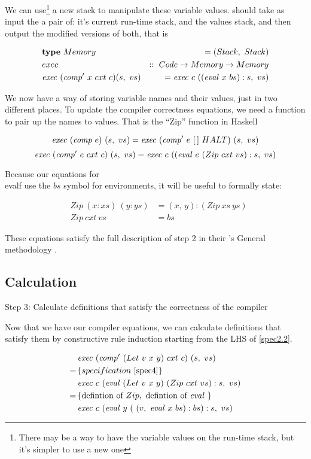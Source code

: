 \documentclass {article}
\begin{document}
We can use\footnote{
There may be a way to have the variable values
on the run-time stack, but it's
simpler to use a new one}
a new stack to
manipulate these variable values.
\exec should take as input
the a pair of:
it's current run-time stack,
and the values stack,
and then output the modified versions of both,
that is

\begin{eqnarray}
&\textbf{type}\ Memory\ &= (Stack,\ Stack)\\
&exec &::\ Code \rightarrow Memory \rightarrow Memory \nonumber \\
&\mathit{exec\ } (\mathit{comp'\ }  x\ cxt\ c) (s,\ vs) 
	&= \mathit{exec\ } c\ ((\mathit{eval\ }  x\ bs):s,\ vs) \label{spec4}
\end{eqnarray}

We now have a way of storing variable names
and their values, 
just in two different places.
To update the compiler correctness equations,
we need a function to pair up the names
to values.
That is the ``Zip'' function in Haskell

	\[ \mathit{exec\ } (\mathit{comp\ } e)\ (s,\ vs) 
		= \mathit{exec\ } (\mathit{comp'\ }  e\ [\,]\ HALT)\ (s,\ vs) \]
	\[ \mathit{exec\ } (\mathit{comp'\ }  e\ cxt\ c)\ (s,\ vs) 
		= \mathit{exec\ } c\ ((\mathit{eval\ }  e\ (Zip\ cxt\ vs):s,\ vs) \]

Because our equations for \\evalf 
use the $bs$ symbol for environments,
it will be useful to formally state:

\begin{eqnarray}
&Zip\ (x:xs)\ (y:ys) &= (x,\, y):(Zip\ xs\ ys)  \\ \label{ziden}
&Zip\ cxt\ vs &= bs \label{zcxtvs}
\end{eqnarray}
	
These equations satisfy the full description
of step 2 in their \BH's General methodology
\cite[page 42]{bandh}.


\subsection{Calculation}

Step 3: Calculate definitions that satisfy
	the correctness of the compiler

Now that we have our compiler equations,
we can calculate definitions that satisfy
them by constructive rule induction
starting from the LHS of \ref{spec2.2}\cite[pg 42]{bandh}.

\begin{align*}
	&\mathit{exec\ } (\mathit{comp'\ }  (Let\ v\ x\ y)\ cxt\ c)\ (s,\ vs) \\
	=\, & \{ specification\ \ref{spec4} \} \\
	&\mathit{exec\ } c\ (\mathit{eval\ }  (Let\ v\ x\ y)\ (Zip\ cxt\ vs):s,\ vs) \\
	=\, & \{\mbox{defintion of}\ Zip,\ \mbox{defintion of}\ \mathit{eval\ } \} \\
	&\mathit{exec\ } c\ (\mathit{eval\ }  y\ (\ (v,\ \mathit{eval\ }  x\ bs) :bs) : s,\ vs)
\end{align*}
\end{document}
